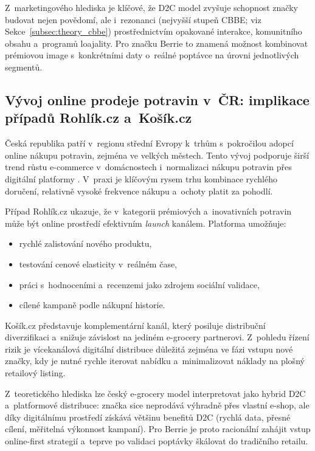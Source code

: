 Z~marketingového hlediska je klíčové, že D2C model zvyšuje schopnost značky budovat nejen povědomí, ale i~rezonanci (nejvyšší stupeň CBBE; viz Sekce~\ref{subsec:theory_cbbe}) prostřednictvím opakované interakce, komunitního obsahu a~programů loajality. Pro značku Berrie to znamená možnost kombinovat prémiovou image s~konkrétními daty o~reálné poptávce na úrovni jednotlivých segmentů.

\subsection{Vývoj online prodeje potravin v~ČR: implikace případů Rohlík.cz a~Košík.cz}
\label{subsec:theory_cz_egrocery}

Česká republika patří v~regionu střední Evropy k~trhům s~pokročilou adopcí online nákupu potravin, zejména ve velkých městech. Tento vývoj podporuje širší trend růstu e-commerce v~domácnostech i~normalizaci nákupu potravin přes digitální platformy \parencite{eurostat_ecommerce_2025, czso_ict_2025}. V~praxi je klíčovým rysem trhu kombinace rychlého doručení, relativně vysoké frekvence nákupu a~ochoty platit za pohodlí.

Případ Rohlík.cz ukazuje, že v~kategorii prémiových a~inovativních potravin může být online prostředí efektivním \emph{launch} kanálem. Platforma umožňuje:
\begin{itemize}
  \item rychlé zalistování nového produktu,
  \item testování cenové elasticity v~reálném čase,
  \item práci s~hodnoceními a~recenzemi jako zdrojem sociální validace,
  \item cílené kampaně podle nákupní historie.
\end{itemize}

Košík.cz představuje komplementární kanál, který posiluje distribuční diverzifikaci a~snižuje závislost na jediném e-grocery partnerovi. Z~pohledu řízení rizik je vícekanálová digitální distribuce důležitá zejména ve fázi vstupu nové značky, kdy je nutné rychle iterovat nabídku a~minimalizovat náklady na plošný retailový listing.

Z~teoretického hlediska lze český e-grocery model interpretovat jako hybrid D2C a~platformové distribuce: značka sice neprodává výhradně přes vlastní e-shop, ale díky digitálnímu prostředí získává většinu benefitů D2C (rychlá data, přesné cílení, měřitelná výkonnost kampaní). Pro Berrie je proto racionální zahájit vstup online-first strategií a~teprve po validaci poptávky škálovat do tradičního retailu.

